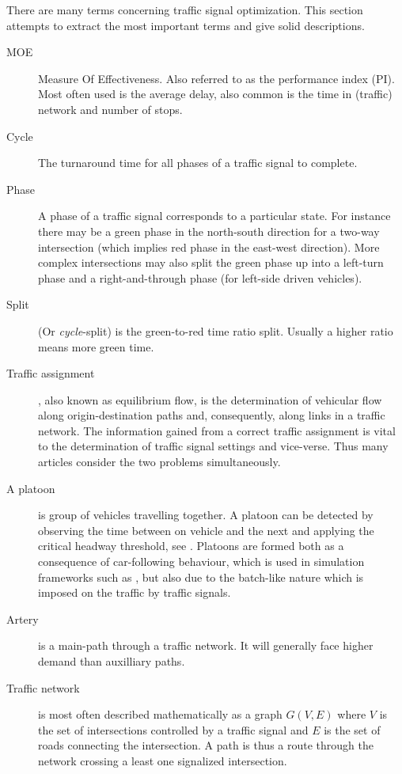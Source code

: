 \label{vocabulary}
There are many terms concerning traffic signal optimization. This section attempts to extract the most important terms and give solid descriptions.


\begin{description}
	\item[MOE] Measure Of Effectiveness. Also referred to as the performance index (PI).
	Most often used is the average delay, also common is the time in (traffic) network and number of stops. 
			
	\item[Cycle] The turnaround time for all phases of a traffic signal to complete.
	
	\item[Phase] A phase of a traffic signal corresponds to a particular state. 
	For instance there may be a green phase in the north-south direction for a two-way intersection (which implies red phase in the east-west direction).
	More complex intersections may also split the green phase up into a left-turn phase and a right-and-through phase (for left-side driven vehicles).
	
	\item[Split] (Or \textit{cycle}-split) is the green-to-red time ratio split. Usually a higher ratio means more green time.
	
	\item[Traffic assignment], also known as equilibrium flow, is the determination of vehicular flow along origin-destination paths and, consequently, along links in a traffic network. The information gained from a correct traffic assignment is vital to the determination of traffic signal settings and vice-verse. Thus many articles consider the two problems simultaneously.

	\item[A platoon] is group of vehicles travelling together. A platoon can be detected by observing the time between on vehicle and the next and applying the critical headway threshold, see \cite[sct. 2]{25}. 
Platoons are formed both as a consequence of car-following behaviour, which is used in simulation frameworks such as \cite{treiber-2000-62}, but also due to the batch-like nature which is imposed on the traffic by traffic signals.

\item[Artery] is a main-path through a traffic network. It will generally face higher demand than auxilliary paths.

\item[Traffic network] is most often described mathematically as a graph $G(V,E)$ where $V$ is the set of intersections controlled by a traffic signal and $E$ is the set of roads connecting the intersection. A path is thus a route through the network crossing a least one signalized intersection.
\end{description}
